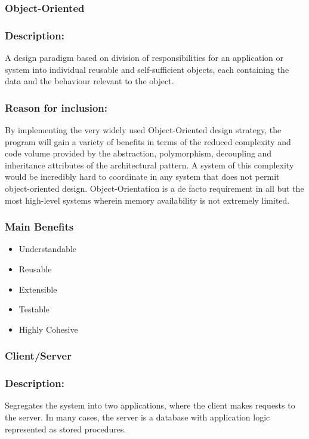 \subsubsection{Object-Oriented}
\subsubsection*{Description:}
		A design paradigm based on division of responsibilities for an application or system into individual reusable and self-sufficient objects, each containing the data and the behaviour relevant to the object.
		
\subsubsection*{Reason for inclusion:}
	By implementing the very widely used Object-Oriented design strategy, the program will gain a variety of benefits in terms of the reduced complexity and code volume provided by the abstraction, polymorphism, decoupling and inheritance attributes of the architectural pattern.
	A system of this complexity would be incredibly hard to coordinate in any system that does not permit object-oriented design. Object-Orientation is a de facto requirement in all but the most high-level systems wherein memory availability is not extremely limited.
	
	\subsubsection*{Main Benefits}
	\begin{itemize}
		\item Understandable
		\item Reusable
		\item Extensible
		\item Testable
		\item Highly Cohesive
	\end{itemize}
	
	
	
	\subsubsection{Client/Server}
	\subsubsection*{Description:}
		Segregates the system into two applications, where the client makes requests to the server. In many cases, the server is a database with application logic represented as stored procedures.
			

